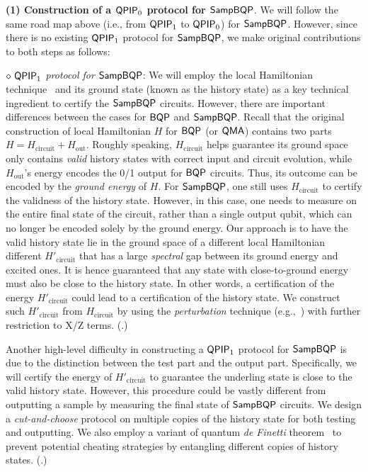 \vspace{2mm} \noindent \textbf{(1) Construction of a $\operatorname{\mathsf{QPIP}}_0$ protocol for $\operatorname{\mathsf{SampBQP}}$}. 
We will follow the same road map above (i.e., from $\operatorname{\mathsf{QPIP}}_1$ to $\operatorname{\mathsf{QPIP}}_0$) for $\operatorname{\mathsf{SampBQP}}$. However, since there is no existing $\operatorname{\mathsf{QPIP}}_1$ protocol for $\operatorname{\mathsf{SampBQP}}$, we make original contributions to both steps as follows: 

\vspace{2mm} \noindent \emph{$\diamond \, \operatorname{\mathsf{QPIP}}_1$ protocol for $\operatorname{\mathsf{SampBQP}}$}: We will employ the local Hamiltonian technique~\cite{kitaev2002classical} and its ground state (known as the history state) as a key technical ingredient to certify the $\operatorname{\mathsf{SampBQP}}$ circuits. 
However, there are important differences between the cases for $\operatorname{\mathsf{BQP}}$ and $\operatorname{\mathsf{SampBQP}}$. 
Recall that the original construction of local Hamiltonian $H$ for $\operatorname{\mathsf{BQP}}$ (or $\operatorname{\mathsf{QMA}}$) contains two parts $H=H_{\mathrm{circuit}}+ H_{\mathrm{out}}$. 
Roughly speaking, $H_{\mathrm{circuit}}$ helps guarantee its ground space only contains \emph{valid} history states with correct input and circuit evolution, while $H_{\mathrm{out}}$'s energy encodes the 0/1 output for $\operatorname{\mathsf{BQP}}$ circuits. 
Thus, its outcome can be encoded by the \emph{ground energy} of $H$. 
For $\operatorname{\mathsf{SampBQP}}$, one still uses $H_{\mathrm{circuit}}$ to certify the validness of the history state. 
However, in this case, one needs to measure on the entire final state of the circuit, rather than a single output qubit, 
which can no longer be encoded solely by the ground energy. 
Our approach is to have the valid history state lie in the ground space of a different local Hamiltonian different $H'_{\mathrm{circuit}}$ that has a large \emph{spectral} gap between its ground energy and excited ones. 
It is hence guaranteed that any state with close-to-ground energy must also be close to the history state. 
In other words, a certification of the energy $H'_{\mathrm{circuit}}$ could lead to a certification of the history state. 
We construct such $H'_{\mathrm{circuit}}$ from $H_{\mathrm{circuit}}$ by using the \emph{perturbation} technique (e.g.,~\cite{kempe_kitaev_regev_2006}) with further restriction to X/Z terms. (.)


Another high-level difficulty in constructing a $\operatorname{\mathsf{QPIP}}_1$ protocol for $\operatorname{\mathsf{SampBQP}}$ is due to the distinction between the test part and the output part. 
Specifically, we will certify the energy of $H'_{\mathrm{circuit}}$ to guarantee the underling state is close to the valid history state. 
However, this procedure could be vastly different from outputting a sample by measuring the final state of $\operatorname{\mathsf{SampBQP}}$ circuits. 
We design a \emph{cut-and-choose} protocol on multiple copies of the history state for both testing and outputting. 
We also employ a variant of quantum \emph{de Finetti} theorem~\cite{Brandão2017}
to prevent potential cheating strategies by entangling different copies of history states. 
(.)

